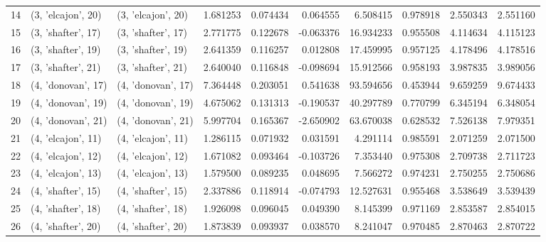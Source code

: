 \begin{tabular}{lllrrrrrrr}
14 &  (3, 'elcajon', 20) &  (3, 'elcajon', 20) &  1.681253 &  0.074434 &  0.064555 &   6.508415 &  0.978918 &  2.550343 &  2.551160 \\
15 &  (3, 'shafter', 17) &  (3, 'shafter', 17) &  2.771775 &  0.122678 & -0.063376 &  16.934233 &  0.955508 &  4.114634 &  4.115123 \\
16 &  (3, 'shafter', 19) &  (3, 'shafter', 19) &  2.641359 &  0.116257 &  0.012808 &  17.459995 &  0.957125 &  4.178496 &  4.178516 \\
17 &  (3, 'shafter', 21) &  (3, 'shafter', 21) &  2.640040 &  0.116848 & -0.098694 &  15.912566 &  0.958193 &  3.987835 &  3.989056 \\
18 &  (4, 'donovan', 17) &  (4, 'donovan', 17) &  7.364448 &  0.203051 &  0.541638 &  93.594656 &  0.453944 &  9.659259 &  9.674433 \\
19 &  (4, 'donovan', 19) &  (4, 'donovan', 19) &  4.675062 &  0.131313 & -0.190537 &  40.297789 &  0.770799 &  6.345194 &  6.348054 \\
20 &  (4, 'donovan', 21) &  (4, 'donovan', 21) &  5.997704 &  0.165367 & -2.650902 &  63.670038 &  0.628532 &  7.526138 &  7.979351 \\
21 &  (4, 'elcajon', 11) &  (4, 'elcajon', 11) &  1.286115 &  0.071932 &  0.031591 &   4.291114 &  0.985591 &  2.071259 &  2.071500 \\
22 &  (4, 'elcajon', 12) &  (4, 'elcajon', 12) &  1.671082 &  0.093464 & -0.103726 &   7.353440 &  0.975308 &  2.709738 &  2.711723 \\
23 &  (4, 'elcajon', 13) &  (4, 'elcajon', 13) &  1.579500 &  0.089235 &  0.048695 &   7.566272 &  0.974231 &  2.750255 &  2.750686 \\
24 &  (4, 'shafter', 15) &  (4, 'shafter', 15) &  2.337886 &  0.118914 & -0.074793 &  12.527631 &  0.955468 &  3.538649 &  3.539439 \\
25 &  (4, 'shafter', 18) &  (4, 'shafter', 18) &  1.926098 &  0.096045 &  0.049390 &   8.145399 &  0.971169 &  2.853587 &  2.854015 \\
26 &  (4, 'shafter', 20) &  (4, 'shafter', 20) &  1.873839 &  0.093937 &  0.038570 &   8.241047 &  0.970485 &  2.870463 &  2.870722 \\
\bottomrule
\end{tabular}
